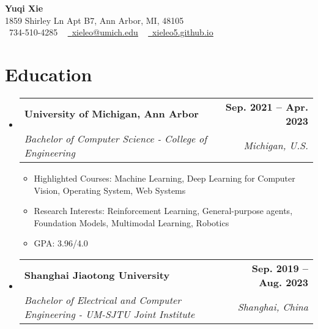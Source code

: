 \documentclass[letterpaper,11pt]{article}
\makeatletter
\newcommand{\resumeSubheading}[5]{
  \vspace{-2pt}\item
    \begin{tabular*}{1.0\textwidth}[t]{l@{\extracolsep{\fill}}r}
      \textbf{#1} \textit{#2} & \textbf{\small #3} \\
      \textit{\small#4} & \textit{\small #5} \\
    \end{tabular*}\vspace{-7pt}
}
\newcommand{\resumeSubHeadingListStart}{\begin{itemize}[leftmargin=0.0in, label={}]}
\newcommand{\resumeSubHeadingListEnd}{\end{itemize}}
\makeatother
\begin{document}

\begin{center}
    {\Large \textbf{Yuqi Xie} } \\ \vspace{1pt}
    1859 Shirley Ln Apt B7, Ann Arbor, MI, 48105 \\ \vspace{1pt}
    \small \raisebox{-0.1\height}\faPhone\ 734-510-4285 ~ \href{mailto:xieleo@umich.edu}{\raisebox{-0.2\height}\faEnvelope\  \underline{xieleo@umich.edu}} ~ 
    \href{https://xieleo5.github.io}{\raisebox{-0.2\height}\faGithub\ \underline{xieleo5.github.io}}
    \vspace{-8pt}
\end{center}


\section{Education}
  \resumeSubHeadingListStart
    \resumeSubheading
      {University of Michigan, Ann Arbor}{}{Sep. 2021 -- Apr. 2023}
      {Bachelor of Computer Science - College of Engineering}{Michigan, U.S.}
    \begin{itemize}
      \item \small Highlighted Courses: Machine Learning, Deep Learning for Computer Vision, Operating System, Web Systems
      \item \small Research Interests: Reinforcement Learning, General-purpose agents, Foundation Models, Multimodal Learning, Robotics
      \item \small GPA: 3.96/4.0
    \end{itemize}
    \vspace*{5.0\multicolsep}
  \resumeSubHeadingListEnd
  \resumeSubHeadingListStart
    \resumeSubheading
      {Shanghai Jiaotong University}{}{Sep. 2019 -- Aug. 2023}
      {Bachelor of Electrical and Computer Engineering - UM-SJTU Joint Institute}{Shanghai, China}
  \resumeSubHeadingListEnd
\end{document}
